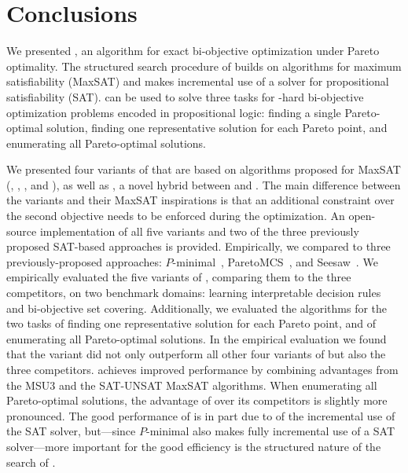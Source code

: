 \chapter{Conclusions\label{chap:conclusion}}

We presented \algname{}, an algorithm for exact bi-objective optimization under Pareto optimality.
The structured search procedure of \algname{} builds on algorithms for maximum satisfiability (MaxSAT) and makes incremental use of a solver for propositional satisfiability (SAT).
\algname{} can be used to solve three tasks for \NP-hard bi-objective optimization problems encoded in propositional logic:
finding a single Pareto-optimal solution, finding one representative solution for each Pareto point, and enumerating all Pareto-optimal solutions.

We presented four variants of \algname{} that are based on algorithms proposed for MaxSAT (\satunsat{}, \unsatsat{}, \msu{}, and \oll{}), as well as \msh{}, a novel hybrid between \msu{} and \satunsat{}.
The main difference between the \algname{} variants and their MaxSAT inspirations is that an additional constraint over the second objective needs to be enforced during the optimization.
An open-source implementation of all five variants and two of the three previously proposed SAT-based approaches is provided.
Empirically, we compared \algname{} to three previously-proposed approaches:
$P$-minimal~\autocite{DBLP:conf/cp/SohBTB17}, ParetoMCS~\autocite{DBLP:conf/ijcai/Terra-NevesLM18a}, and Seesaw~\autocite{DBLP:conf/cp/JanotaMSM21}.
We empirically evaluated the five variants of \algname{}, comparing them to the three competitors, on two benchmark domains: learning interpretable decision rules~\autocite{DBLP:conf/cp/MaliotovM18} and bi-objective set covering.
Additionally, we evaluated the algorithms for the two tasks of finding one representative solution for each Pareto point, and of enumerating all Pareto-optimal solutions.
In the empirical evaluation we found that the \msh{} variant did not only outperform all other four variants of \algname{} but also the three competitors.
\msh{} achieves improved performance by combining advantages from the MSU3 and the SAT-UNSAT MaxSAT algorithms.
When enumerating all Pareto-optimal solutions, the advantage of \algname{} over its competitors is slightly more pronounced.
The good performance of \algname{} is in part due to of the incremental use of the SAT solver, but---since $P$-minimal also makes fully incremental use of a SAT solver---more important for the good efficiency is the structured nature of the search of \algname{}.

